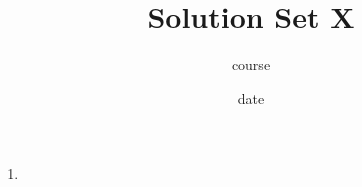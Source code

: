 




\title{Solution Set X}
\author[Daniel Gonzalez Cedre]{course}
\date{date}



\maketitle

\begin{enumerate}
  \item
\end{enumerate}


